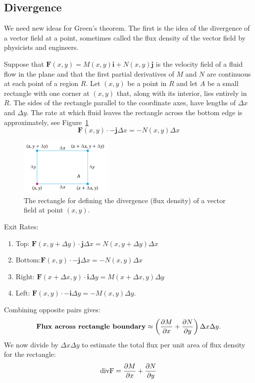 \documentclass[a4paper,12pt]{article}
\begin{document}
\begin{CJK}{UTF8}{gbsn}
\subsection{Divergence}
We need new ideas for Green's theorem. The first is the idea of the 
divergence of a vector field at a point, sometimes called the flux 
density of the vector field by physicists and engineers. 

Suppose that $\bm{F}(x,y) = M(x,y)\bm{i} + N(x,y)\bm{j}$ is the velocity 
field of a fluid flow in the plane and that the first partial derivatives 
of $M$ and $N$ are continuous at each point of a region $R$. Let $(x,y)$ be a 
point in $R$ and let $A$ be a small rectangle with one corner at $(x,y)$ 
that, along with its interior, lies entirely in $R$. The sides of the 
rectangle parallel to the coordinate axes, have lengths of $\Delta x$ and $\Delta y$.
The rate at which fluid leaves the rectangle across the bottom edge is 
approximately, see Figure~\ref{fig:fig9}
\[
    \bm{F}(x,y) \cdot \bm{-j} \Delta x = -N(x,y)\Delta x
\]
\begin{figure}[htbp]
    \centering 
    \includegraphics[height=0.3\textwidth, width=0.4\textwidth]{divergence1.png}
    \caption{The rectangle for defining the divergence (flux density) 
    of a vector field at point $(x,y)$.}
    \label{fig:fig9}
\end{figure}

Exit Rates:
\begin{enumerate}
    \item Top: $\bm{F}(x,y+\Delta y) \cdot \bm{j} \Delta x = N(x,y+\Delta y)\Delta x$
    \item Bottom:$\bm{F}(x,y) \cdot \bm{-j} \Delta x = -N(x,y)\Delta x$
    \item Right: $\bm{F}(x+\Delta x,y) \cdot \bm{i} \Delta y = M(x+\Delta x,y)\Delta y$
    \item Left: $\bm{F}(x,y) \cdot \bm{-i} \Delta y = -M(x,y)\Delta y.$
\end{enumerate}

Combining opposite pairs gives:
\[
    {\rm \textbf{Flux across rectangle boundary}} \approx \left(
    \frac{\partial M}{\partial x} + \frac{\partial N}{\partial y}\right)
    \Delta x \Delta y.
\]
We now divide by $\Delta x \Delta y$ to estimate the total flux per unit area of 
flux density for the rectangle:
\[
{\rm {div \bm{F}}} = \frac{\partial M}{\partial x} + \frac{\partial N}{\partial y}
\]


\end{CJK}
\end{document}

